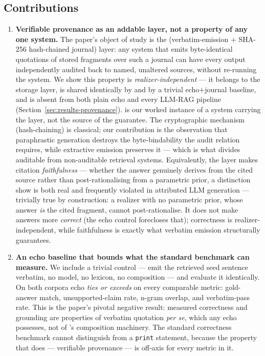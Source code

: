 \subsection{Contributions}
\label{sec:contributions}

\begin{enumerate}
    \item \textbf{Verifiable provenance as an addable layer, not a
    property of any one system.} The paper's object of study is the
    (verbatim-emission $+$ SHA-256 hash-chained journal) layer: any
    system that emits byte-identical quotations of stored fragments
    over such a journal can have every output independently audited
    back to named, unaltered sources, without re-running the
    system. We show this property is \emph{realizer-independent} ---
    it belongs to the storage layer, is shared identically by
    \hyphae{} and by a trivial echo$+$journal baseline, and is
    absent from both plain echo and every LLM-RAG pipeline
    (Section~\ref{sec:results-provenance}). \hyphae{} is our worked
    instance of a system carrying the layer, not the source of the
    guarantee. The cryptographic mechanism (hash-chaining) is
    classical; our contribution is the observation that paraphrastic
    generation destroys the byte-bindability the audit relation
    requires, while extractive emission preserves it --- which is
    what divides auditable from non-auditable retrieval systems.
    Equivalently, the layer makes citation \emph{faithfulness}
    --- whether the answer genuinely derives from the cited source
    rather than post-rationalising from a parametric prior, a
    distinction \citet{wallat2024faithfulness} show is both real and
    frequently violated in attributed LLM generation --- trivially
    true by construction: a realizer with no parametric prior, whose
    answer \emph{is} the cited fragment, cannot post-rationalise. It
    does not make answers more \emph{correct} (the echo control
    forecloses that); correctness is realizer-independent, while
    faithfulness is exactly what verbatim emission structurally
    guarantees.

    \item \textbf{An echo baseline that bounds what the standard
    benchmark can measure.} We include a trivial control --- emit
    the retrieved seed sentence verbatim, no model, no lexicon,
    no composition --- and evaluate it identically. On both
    corpora echo \emph{ties or exceeds} \hyphae{} on
    every comparable metric: gold-answer match, unsupported-claim
    rate, n-gram overlap, and verbatim-pass rate. This is the
    paper's pivotal negative result: measured correctness and
    grounding are properties of verbatim quotation \emph{per se},
    which any echo possesses, not of \hyphae{}'s composition
    machinery. The standard correctness benchmark cannot
    distinguish \hyphae{} from a \texttt{print} statement, because
    the property that does --- verifiable provenance --- is
    off-axis for every metric in it.


\end{enumerate}
